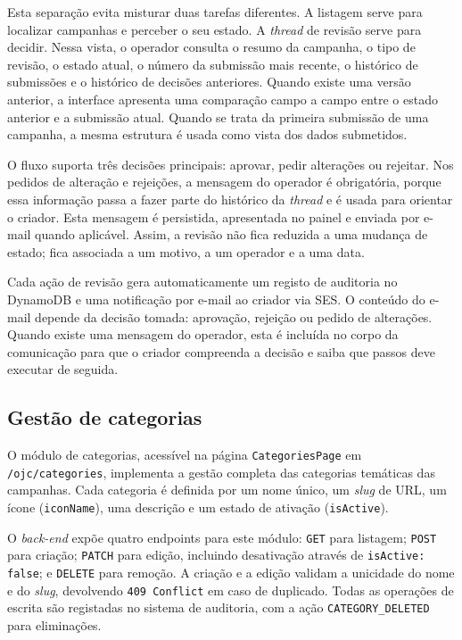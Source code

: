 Esta separação evita misturar duas tarefas diferentes. A listagem serve para localizar campanhas e perceber o seu estado. A \textit{thread} de revisão serve para decidir. Nessa vista, o operador consulta o resumo da campanha, o tipo de revisão, o estado atual, o número da submissão mais recente, o histórico de submissões e o histórico de decisões anteriores. Quando existe uma versão anterior, a interface apresenta uma comparação campo a campo entre o estado anterior e a submissão atual. Quando se trata da primeira submissão de uma campanha, a mesma estrutura é usada como vista dos dados submetidos.

O fluxo suporta três decisões principais: aprovar, pedir alterações ou rejeitar. Nos pedidos de alteração e rejeições, a mensagem do operador é obrigatória, porque essa informação passa a fazer parte do histórico da \textit{thread} e é usada para orientar o criador. Esta mensagem é persistida, apresentada no painel e enviada por e-mail quando aplicável. Assim, a revisão não fica reduzida a uma mudança de estado; fica associada a um motivo, a um operador e a uma data.

Cada ação de revisão gera automaticamente um registo de auditoria no DynamoDB e uma notificação por e-mail ao criador via \gls{SES}. O conteúdo do e-mail depende da decisão tomada: aprovação, rejeição ou pedido de alterações. Quando existe uma mensagem do operador, esta é incluída no corpo da comunicação para que o criador compreenda a decisão e saiba que passos deve executar de seguida.

\subsection{Gestão de categorias}
\label{subsec:impl_categories}

O módulo de categorias, acessível na página \texttt{CategoriesPage} em \texttt{/ojc/categories}, implementa a gestão completa das categorias temáticas das campanhas. Cada categoria é definida por um nome único, um \textit{slug} de URL, um ícone (\texttt{iconName}), uma descrição e um estado de ativação (\texttt{isActive}).

O \textit{back-end} expõe quatro endpoints para este módulo: \texttt{GET}  para listagem; \texttt{POST}  para criação; \texttt{PATCH}  para edição, incluindo desativação através de \texttt{isActive: false}; e \texttt{DELETE}  para remoção. A criação e a edição validam a unicidade do nome e do \textit{slug}, devolvendo \texttt{409 Conflict} em caso de duplicado. Todas as operações de escrita são registadas no sistema de auditoria, com a ação \texttt{CATEGORY\_DELETED} para eliminações.

